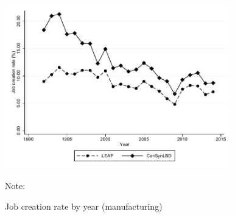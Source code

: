 \begin{figure} [H]
\centering
\caption{Job creation rate  by year (manufacturing)} \label{JobCreationManufacturing}
\includegraphics[height=2.8in, width=.7\linewidth]{graphs/Job_creation_rate_by_year_Manufacturing_bw.pdf} 
\begin{minipage}{0.85\textwidth}
{\footnotesize Note: \TableNote \par}
\end{minipage}
\end{figure}

